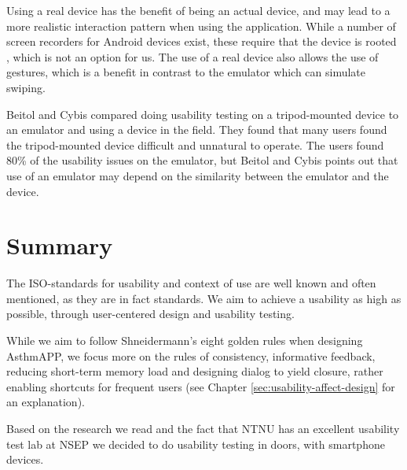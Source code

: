 Using a real device has the benefit of being an actual device, and may lead to a more realistic interaction pattern when using the application. While a number of screen recorders for Android devices exist, these require that the device is rooted , which is not an option for us. 
The use of a real device also allows the use of gestures, which is a benefit in contrast to the emulator which can simulate swiping. 


Beitol and Cybis\cite{betiol2005usability} compared doing usability testing on a tripod-mounted device to an emulator and using a device in the field. They found that many users found the tripod-mounted device difficult and unnatural to operate. The users found 80\% of the usability issues on the emulator, but Beitol and Cybis points out that use of an emulator may depend on the similarity between the emulator and the device. 



\section{Summary}
\label{sec:usabilitysummary}

The ISO-standards for usability and context of use\cite{isousability} are well known and often mentioned, as they are in fact standards. We aim to achieve a usability as high as possible, through user-centered design and usability testing. 

While we aim to follow Shneidermann's eight golden rules\cite{shneiderman2003designing} when designing AsthmAPP, we focus more on the rules of consistency, informative feedback, reducing short-term memory load and designing dialog to yield closure, rather enabling shortcuts for frequent users (see Chapter \ref{sec:usability-affect-design} for an explanation).

Based on the research we read and the fact that NTNU has an excellent usability test lab at NSEP we decided to do usability testing in doors, with smartphone devices. 